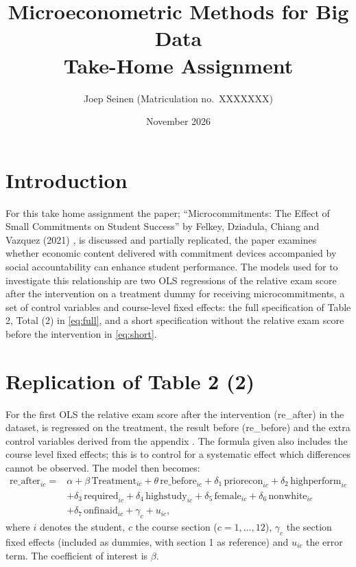 \documentclass[12pt]{article}
\title{Microeconometric Methods for Big Data\\ Take-Home Assignment}
\author{Joep Seinen (Matriculation no.\ XXXXXXX)}
\date{November 2026}
\begin{document}
\maketitle

\section{Introduction}

For this take home assignment the paper; \enquote{Microcommitments: The Effect of Small Commitments on Student Success} by Felkey, Dziadula, Chiang and Vazquez (2021) \cite{felkey2021}, is discussed and partially replicated, the paper examines whether economic content delivered with commitment devices accompanied by social accountability can enhance student performance. The models used for to investigate this relationship are two OLS regressions of the relative exam score after the intervention on a treatment dummy for receiving microcommitments, a set of control variables and course-level fixed effects: the full specification of Table 2, Total (2) in \cref{eq:full}, and a short specification without the relative exam score before the intervention in \cref{eq:short}. 

\section{Replication of Table 2 (2)}
For the first OLS the relative exam score after the intervention (re\_after) in the dataset, is regressed on the treatment, the result before (re\_before) and the extra control variables derived from the appendix \cite{felkey2021appendix}. The formula given also includes the course level fixed effects; this is to control for a systematic effect which differences cannot be observed. The model then becomes:
\begin{equation}
\begin{aligned}
\text{re\_after}_{ic} = {} & \alpha + \beta\,\text{Treatment}_{ic} + \theta\,\text{re\_before}_{ic} + \delta_1\,\text{priorecon}_{ic} + \delta_2\,\text{highperform}_{ic} \\
& + \delta_3\,\text{required}_{ic} + \delta_4\,\text{highstudy}_{ic} + \delta_5\,\text{female}_{ic} + \delta_6\,\text{nonwhite}_{ic} \\
& + \delta_7\,\text{onfinaid}_{ic} + \gamma_c + u_{ic},
\end{aligned}
\label{eq:full}
\end{equation}
where $i$ denotes the student, $c$ the course section ($c = 1,\dots,12$), $\gamma_c$ the section fixed effects (included as dummies, with section 1 as reference) and $u_{ic}$ the error term. The coefficient of interest is $\beta$.
\end{document}
